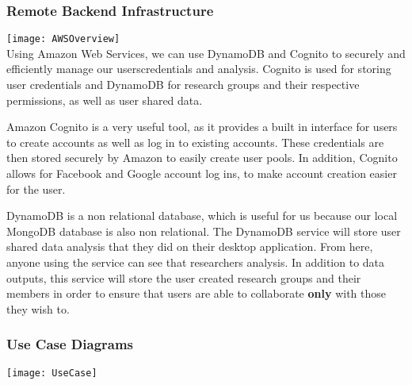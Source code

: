 \subsubsection{Remote Backend Infrastructure}
\texttt{[image: AWSOverview]} \\
Using Amazon Web Services, we can use DynamoDB and Cognito to securely and efficiently manage our users\textquotesingle  credentials and analysis. Cognito is used for storing user credentials and DynamoDB for research groups and their respective permissions, as well as user shared data.\par
Amazon Cognito is a very useful tool, as it provides a built in interface for users to create accounts as well as log in to existing accounts. These credentials are then stored securely by Amazon to easily create user pools. In addition, Cognito allows for Facebook and Google account log ins, to make account creation easier for the user.\par
DynamoDB is a non relational database, which is useful for us because our local MongoDB database is also non relational. The DynamoDB service will store user shared data analysis that they did on their desktop application. From here, anyone using the service can see that researcher\textquotesingle s analysis. In addition to data outputs, this service will store the user created research groups and their members in order to ensure that users are able to collaborate \textbf{only} with those they wish to.

\subsubsection{Use Case Diagrams}
\begin{center}
    \texttt{[image: UseCase]}
\end{center}
\newpage